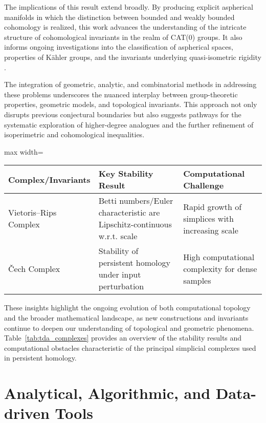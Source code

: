 \documentclass[sigconf]{acmart}
\begin{document}
The implications of this result extend broadly. By producing explicit aspherical manifolds in which the distinction between bounded and weakly bounded cohomology is realized, this work advances the understanding of the intricate structure of cohomological invariants in the realm of CAT(0) groups. It also informs ongoing investigations into the classification of aspherical spaces, properties of Kähler groups, and the invariants underlying quasi-isometric rigidity \cite{ref84}. 

The integration of geometric, analytic, and combinatorial methods in addressing these problems underscores the nuanced interplay between group-theoretic properties, geometric models, and topological invariants. This approach not only disrupts previous conjectural boundaries but also suggests pathways for the systematic exploration of higher-degree analogues and the further refinement of isoperimetric and cohomological inequalities. 

\begin{table*}[htbp]
\centering
\caption{Summary of Key Properties and Computational Challenges of Vietoris--Rips and Čech Complexes}
\label{tab:tda_complexes}
\begin{adjustbox}{max width=\textwidth}
\begin{tabular}{lll}
\toprule
\textbf{Complex/Invariants} & \textbf{Key Stability Result} & \textbf{Computational Challenge} \\
\midrule
Vietoris--Rips Complex      & Betti numbers/Euler characteristic are Lipschitz-continuous w.r.t. scale & Rapid growth of simplices with increasing scale \\
Čech Complex                & Stability of persistent homology under input perturbation & High computational complexity for dense samples \\
\bottomrule
\end{tabular}
\end{adjustbox}
\end{table*}

These insights highlight the ongoing evolution of both computational topology and the broader mathematical landscape, as new constructions and invariants continue to deepen our understanding of topological and geometric phenomena. Table~\ref{tab:tda_complexes} provides an overview of the stability results and computational obstacles characteristic of the principal simplicial complexes used in persistent homology.

\section{Analytical, Algorithmic, and Data-driven Tools}
\end{document}
